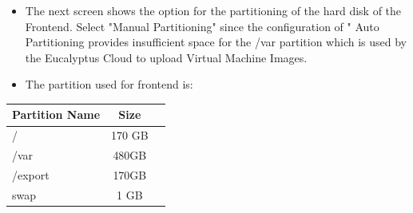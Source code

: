 \begin{itemize}
\item The next screen shows the option for the partitioning of the hard disk of the Frontend. Select "Manual Partitioning" since the configuration of " Auto Partitioning provides insufficient space for the /var partition which is used by the Eucalyptus Cloud to upload Virtual Machine Images.

\item The partition used for frontend is: \\ 
\end{itemize}

\begin{center}
\begin{tabular}{ | l | c | r |}
    \hline
    Partition Name & Size  \\ \hline
    /&170 GB \\ 
    /var&480GB \\
	/export&170GB \\
	swap&1 GB    \\
    \hline
  \end{tabular}
\end{center}

